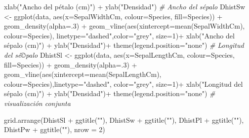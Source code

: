 \documentclass[
]{article}
\newenvironment{Shaded}{\begin{snugshade}}{\end{snugshade}}
\newcommand{\AttributeTok}[1]{\textcolor[rgb]{0.77,0.63,0.00}{#1}}
\newcommand{\CommentTok}[1]{\textcolor[rgb]{0.56,0.35,0.01}{\textit{#1}}}
\newcommand{\DecValTok}[1]{\textcolor[rgb]{0.00,0.00,0.81}{#1}}
\newcommand{\FunctionTok}[1]{\textcolor[rgb]{0.00,0.00,0.00}{#1}}
\newcommand{\NormalTok}[1]{#1}
\newcommand{\OtherTok}[1]{\textcolor[rgb]{0.56,0.35,0.01}{#1}}
\newcommand{\SpecialCharTok}[1]{\textcolor[rgb]{0.00,0.00,0.00}{#1}}
\newcommand{\StringTok}[1]{\textcolor[rgb]{0.31,0.60,0.02}{#1}}
\begin{document}
\begin{Shaded}
\begin{Highlighting}[]
  \FunctionTok{xlab}\NormalTok{(}\StringTok{"Ancho del pétalo (cm)"}\NormalTok{) }\SpecialCharTok{+}  
  \FunctionTok{ylab}\NormalTok{(}\StringTok{"Densidad"}\NormalTok{)}
\CommentTok{\# Ancho del sépalo}
\NormalTok{DhistSw }\OtherTok{\textless{}{-}} \FunctionTok{ggplot}\NormalTok{(data, }\FunctionTok{aes}\NormalTok{(}\AttributeTok{x=}\NormalTok{SepalWidthCm, }\AttributeTok{colour=}\NormalTok{Species, }\AttributeTok{fill=}\NormalTok{Species)) }\SpecialCharTok{+}
  \FunctionTok{geom\_density}\NormalTok{(}\AttributeTok{alpha=}\NormalTok{.}\DecValTok{3}\NormalTok{) }\SpecialCharTok{+}
  \FunctionTok{geom\_vline}\NormalTok{(}\FunctionTok{aes}\NormalTok{(}\AttributeTok{xintercept=}\FunctionTok{mean}\NormalTok{(SepalWidthCm),  }\AttributeTok{colour=}\NormalTok{Species), }\AttributeTok{linetype=}\StringTok{"dashed"}\NormalTok{,}\AttributeTok{color=}\StringTok{"grey"}\NormalTok{, }\AttributeTok{size=}\DecValTok{1}\NormalTok{)}\SpecialCharTok{+}
  \FunctionTok{xlab}\NormalTok{(}\StringTok{"Ancho del sépalo (cm)"}\NormalTok{) }\SpecialCharTok{+}  
  \FunctionTok{ylab}\NormalTok{(}\StringTok{"Densidad"}\NormalTok{)}\SpecialCharTok{+}
  \FunctionTok{theme}\NormalTok{(}\AttributeTok{legend.position=}\StringTok{"none"}\NormalTok{)}
\CommentTok{\# Longitud del sé©palo}
\NormalTok{DhistSl }\OtherTok{\textless{}{-}} \FunctionTok{ggplot}\NormalTok{(data, }\FunctionTok{aes}\NormalTok{(}\AttributeTok{x=}\NormalTok{SepalLengthCm, }\AttributeTok{colour=}\NormalTok{Species, }\AttributeTok{fill=}\NormalTok{Species)) }\SpecialCharTok{+}
  \FunctionTok{geom\_density}\NormalTok{(}\AttributeTok{alpha=}\NormalTok{.}\DecValTok{3}\NormalTok{) }\SpecialCharTok{+}
  \FunctionTok{geom\_vline}\NormalTok{(}\FunctionTok{aes}\NormalTok{(}\AttributeTok{xintercept=}\FunctionTok{mean}\NormalTok{(SepalLengthCm),  }\AttributeTok{colour=}\NormalTok{Species),}\AttributeTok{linetype=}\StringTok{"dashed"}\NormalTok{, }\AttributeTok{color=}\StringTok{"grey"}\NormalTok{, }\AttributeTok{size=}\DecValTok{1}\NormalTok{)}\SpecialCharTok{+}
  \FunctionTok{xlab}\NormalTok{(}\StringTok{"Longitud del sépalo (cm)"}\NormalTok{) }\SpecialCharTok{+}  
  \FunctionTok{ylab}\NormalTok{(}\StringTok{"Densidad"}\NormalTok{)}\SpecialCharTok{+}
  \FunctionTok{theme}\NormalTok{(}\AttributeTok{legend.position=}\StringTok{"none"}\NormalTok{)}
\CommentTok{\# visualización conjunta}

\FunctionTok{grid.arrange}\NormalTok{(DhistSl }\SpecialCharTok{+} \FunctionTok{ggtitle}\NormalTok{(}\StringTok{""}\NormalTok{),}
\NormalTok{             DhistSw  }\SpecialCharTok{+} \FunctionTok{ggtitle}\NormalTok{(}\StringTok{""}\NormalTok{),}
\NormalTok{             DhistPl }\SpecialCharTok{+} \FunctionTok{ggtitle}\NormalTok{(}\StringTok{""}\NormalTok{),}
\NormalTok{             DhistPw  }\SpecialCharTok{+} \FunctionTok{ggtitle}\NormalTok{(}\StringTok{""}\NormalTok{),}
             \AttributeTok{nrow =} \DecValTok{2}\NormalTok{)}
\end{Highlighting}
\end{Shaded}
\end{document}
